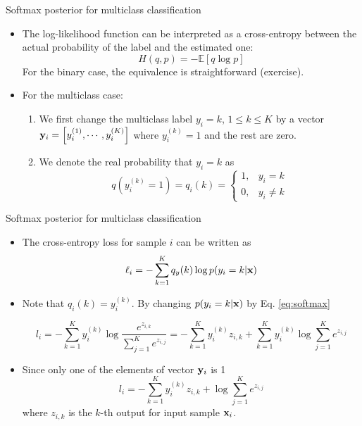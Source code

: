 \documentclass{beamer}
\begin{document}
\begin{frame}{Softmax posterior for multiclass classification}

\begin{itemize}
    \item The log-likelihood function can be interpreted as a cross-entropy between the actual probability of the label and the estimated one:
    \begin{equation}
    H(q,p) = -\mathbb{E} \left[q \log p \right]
    \end{equation}
    For the binary case, the equivalence is straightforward (exercise).
    
    \item For the multiclass case:
    \begin{enumerate}
        \item We first change the multiclass label $y_i =k$, $1\leq k \leq K$ by a vector ${\bf y}_i=\left[ y_i^{(1)},\cdots,y_i^{(K)}  \right]$ where $y_i^{(k)}=1$ and the rest are zero.
        \item We denote the real probability that $y_i=k$ as 
        \begin{equation}
            q\left(y_i^{(k)}=1\right) = q_i(k) = \begin{cases}
            1, & y_i=k\\
            0, & y_i \neq k
            \end{cases}
        \end{equation}
    \end{enumerate}
    
\end{itemize}
\end{frame}

\begin{frame}{Softmax posterior for multiclass classification}
\begin{itemize}
\item The cross-entropy loss for sample $i$ can be written as 
\begin{equation}
\ell_i = -\sum_{k=1}^{K} q_y(k) \log p(y_i=k|{\bf x})      
\end{equation}
\item Note that  $q_i(k)=y^{(k)}_i$. By changing  $p(y_i=k|{\bf x}) $ by Eq. \eqref{eq:softmax}

\begin{equation}\label{eq:cross_entropy1}
    l_i=-\sum_{k=1}^{K} y_i^{(k)} \log\frac{e^{z_{i,k}}}{\sum_{j=1}^{K} e^{z_{i,j}}}
    =-\sum_{k=1}^{K} y_i^{(k)} z_{i,k} +\sum_{k=1}^{K} y_i^{(k)}\log \sum_{j=1}^{K} e^{z_{i,j}}
\end{equation}
\item Since only one of the elements of vector ${\bf y}_i$ is 1
\begin{equation}\label{eq:cross_entropy2}
l_i=-\sum_{k=1}^{K} y_i^{(k)} z_{i,k} + \log \sum_{j=1}^{K} e^{z_{i,j}}\end{equation}
where $z_{i,k}$ is the $k$-th output for input sample ${\bf x}_i$.
\end{itemize}
\end{frame}
	

 
\end{document}
